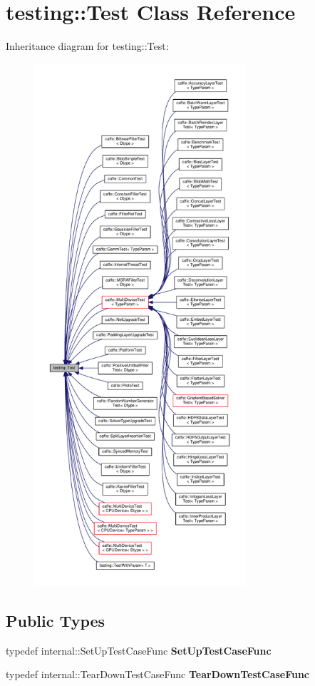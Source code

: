 \hypertarget{classtesting_1_1_test}{}\section{testing\+:\+:Test Class Reference}
\label{classtesting_1_1_test}


Inheritance diagram for testing\+:\+:Test\+:
\nopagebreak
\begin{figure}[H]
\begin{center}
\leavevmode
\includegraphics[height=550pt]{classtesting_1_1_test__inherit__graph}
\end{center}
\end{figure}
\subsection*{Public Types}
\begin{DoxyCompactItemize}
\item 
\mbox{\label{classtesting_1_1_test_a5f2a051d1d99c9b784c666c586186cf9}} 
typedef internal\+::\+Set\+Up\+Test\+Case\+Func {\bfseries Set\+Up\+Test\+Case\+Func}
\item 
\mbox{\label{classtesting_1_1_test_aa0f532e93b9f3500144c53f31466976c}} 
typedef internal\+::\+Tear\+Down\+Test\+Case\+Func {\bfseries Tear\+Down\+Test\+Case\+Func}
\end{DoxyCompactItemize}
